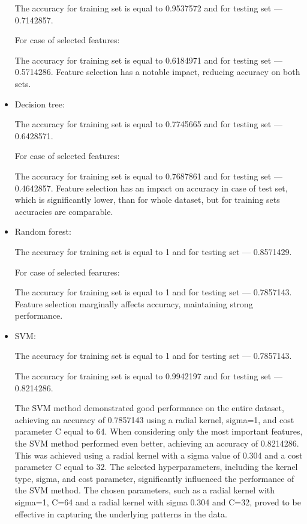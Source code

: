 \documentclass[11pt,a4paper]{article}\usepackage[]{graphicx}\usepackage[]{xcolor}
\begin{document}
\begin{itemize}
The accuracy for training set is equal to 0.9537572 and for testing set --- 0.7142857.

For case of selected features:



The accuracy for training set is equal to 0.6184971 and for testing set --- 0.5714286.
	Feature selection has a notable impact, reducing accuracy on both sets.	
		
		\item Decision tree:
		




The accuracy for training set is equal to 0.7745665 and for testing set --- 0.6428571.

For case of selected features:





The accuracy for training set is equal to 0.7687861 and for testing set --- 0.4642857.
Feature selection has an impact on accuracy in case of test set, which is significantly lower, than for whole dataset, but for training sets accuracies are comparable.
		
		
		\item Random forest:
		




The accuracy for training set is equal to 1 and for testing set --- 0.8571429.

For case of selected fearures:





The accuracy for training set is equal to 1 and for testing set --- 0.7857143.
Feature selection marginally affects accuracy, maintaining strong performance.		

\item SVM:




The accuracy for training set is equal to 1 and for testing set --- 0.7857143.





The accuracy for training set is equal to 0.9942197 and for testing set --- 0.8214286.

		The SVM method demonstrated good performance on the entire dataset, achieving an accuracy of 0.7857143 using a radial kernel, sigma=1, and cost parameter C equal to 64. When considering only the most important features, the SVM method performed even better, achieving an accuracy of 0.8214286. This was achieved using a radial kernel with a sigma value of 0.304 and a cost parameter C equal to 32. The selected hyperparameters, including the kernel type, sigma, and cost parameter, significantly influenced the performance of the SVM method. The chosen parameters, such as a radial kernel with sigma=1, C=64 and a radial kernel with sigma 0.304 and C=32, proved to be effective in capturing the underlying patterns in the data.
	\end{itemize}
	
\end{document}
